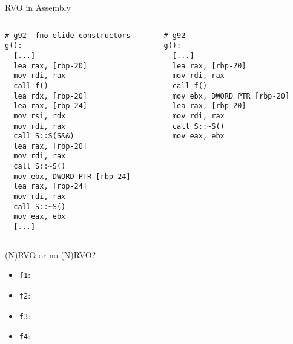 \begin{frame}[fragile]{RVO in Assembly}
    \begin{columns}[t]
        \begin{column}{.45\textwidth}
            \begin{lstlisting}[language={},morekeywords={rdi}]
# g92 -fno-elide-constructors
g():
  [...]
  lea rax, [rbp-20]
  mov rdi, rax
  call f()
  lea rdx, [rbp-20]
  lea rax, [rbp-24]
  mov rsi, rdx
  mov rdi, rax
  call S::S(S&&)
  lea rax, [rbp-20]
  mov rdi, rax
  call S::~S()
  mov ebx, DWORD PTR [rbp-24]
  lea rax, [rbp-24]
  mov rdi, rax
  call S::~S()
  mov eax, ebx
  [...]      
            \end{lstlisting}
        \end{column}
        \begin{column}{.45\textwidth}
            \begin{lstlisting}[language={},morekeywords={rdi}]
# g92
g():
  [...]
  lea rax, [rbp-20]
  mov rdi, rax
  call f()
  mov ebx, DWORD PTR [rbp-20]
  lea rax, [rbp-20]
  mov rdi, rax
  call S::~S()
  mov eax, ebx
            \end{lstlisting}
        \end{column}
    \end{columns}
\end{frame}

\begin{frame}[fragile]{(N)RVO or no (N)RVO?}
    \begin{itemize}
        \item \texttt{f1}: 
        \item \texttt{f2}: 
        \item \texttt{f3}: 
        \item \texttt{f4}: 
    \end{itemize}
\end{frame}


